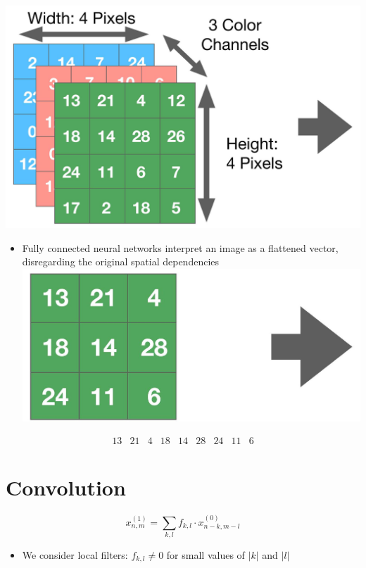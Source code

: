 \documentclass[10pt]{article}
\begin{document}
\begin{center}
\includegraphics[max width=\textwidth]{2024_01_08_959e2db67a31f073f6d2g-04(1)}
\end{center}



\begin{itemize}
  \item Fully connected neural networks interpret an image as a flattened vector, disregarding the original spatial dependencies
\includegraphics[max width=\textwidth, center]{2024_01_08_959e2db67a31f073f6d2g-04}
\end{itemize}

$$
\begin{array}{l|l|l|l|l|l|l|l|l}
13 & 21 & 4 & 18 & 14 & 28 & 24 & 11 & 6
\end{array}
$$

\section*{Convolution}
$$
x_{n, m}^{(1)}=\sum_{k, l} f_{k, l} \cdot x_{n-k, m-l}^{(0)}
$$

\begin{itemize}
  \item We consider local filters: $f_{k, l} \neq 0$ for small values of $|k|$ and $|l|$
\end{itemize}
\end{document}
